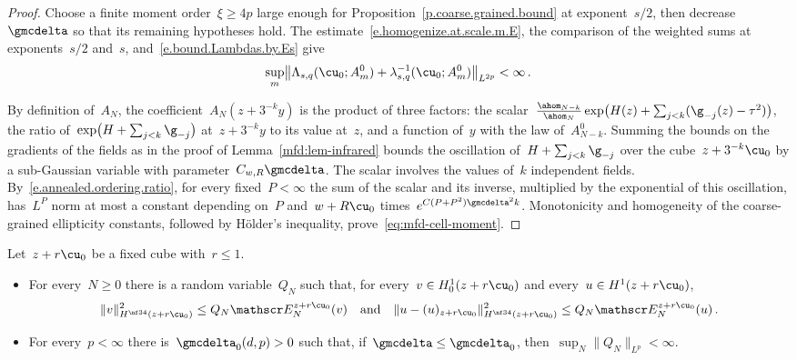 \documentclass[11pt]{amsart}
\begin{document}
\begin{proof}
Choose a finite moment order~$\xi\geq4p$ large enough for Proposition~\ref{p.coarse.grained.bound} at exponent~$s/2$, then decrease~$\gmcdelta$ so that its remaining hypotheses hold. The estimate~\eqref{e.homogenize.at.scale.m.E}, the comparison of the weighted sums at exponents~$s/2$ and~$s$, and~\eqref{e.bound.Lambdas.by.Es} give
\begin{equation*}
	\sup_m\bigl\|\Lambda_{s,q}(\cu_0;A_m^0)
	+\lambda_{s,q}^{-1}(\cu_0;A_m^0)\bigr\|_{L^{2p}}<\infty\,.
\end{equation*}

\smallskip

By definition of~$A_N$, the coefficient~$A_N(z+3^{-k}y)$ is the product of three factors: the scalar~$\frac{\ahom_{N-k}}{\ahom_N}\exp\bigl(H(z)+\sum_{j<k}(\g_{-j}(z)-\tau^2)\bigr)$, the ratio of~$\exp\bigl(H+\sum_{j<k}\g_{-j}\bigr)$ at~$z+3^{-k}y$ to its value at~$z$, and a function of~$y$ with the law of~$A_{N-k}^0$. Summing the bounds on the gradients of the fields as in the proof of Lemma~\ref{mfd:lem-infrared} bounds the oscillation of~$H+\sum_{j<k}\g_{-j}$ over the cube~$z+3^{-k}\cu_0$ by a sub-Gaussian variable with parameter~$C_{w,R}\gmcdelta$. The scalar involves the values of~$k$ independent fields. By~\eqref{e.annealed.ordering.ratio}, for every fixed~$P<\infty$ the sum of the scalar and its inverse, multiplied by the exponential of this oscillation, has~$L^P$ norm at most a constant depending on~$P$ and~$w+R\cu_0$ times~$e^{C(P+P^2)\gmcdelta^2k}$. Monotonicity and homogeneity of the coarse-grained ellipticity constants, followed by H\"older's inequality, prove~\eqref{eq:mfd-cell-moment}.
\end{proof}

\begin{lemma}
\label{mfd:lem-coercivity}
Let~$z+r\cu_0$ be a fixed cube with~$r\leq1$.
\begin{itemize}
\item For every~$N\geq0$ there is a random variable~$Q_N$ such that, for every~$v\in H^1_0(z+r\cu_0)$ and every~$u\in H^1(z+r\cu_0)$,
\begin{equation}
	\|v\|_{H^{\nf34}(z+r\cu_0)}^2\leq Q_N\mathscr E_N^{z+r\cu_0}(v)
	\quad\text{and}\quad
	\|u-(u)_{z+r\cu_0}\|_{H^{\nf34}(z+r\cu_0)}^2\leq Q_N\mathscr E_N^{z+r\cu_0}(u)\,.
	\label{eq:mfd-1}
\end{equation}
\item For every~$p<\infty$ there is~$\gmcdelta_0(d,p)>0$ such that, if~$\gmcdelta\leq\gmcdelta_0$, then~$\sup_N\|Q_N\|_{L^p}<\infty$.
\end{itemize}
\end{lemma}
\end{document}
